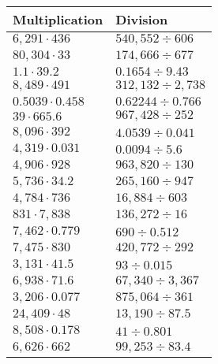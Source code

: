 \begin{longtable}[]{@{}ll@{}}
\toprule
Multiplication & Division\tabularnewline
\midrule
\endhead
\(6,291\cdot436\) & \(540,552÷606\)\tabularnewline
\(80,304\cdot33\) & \(174,666÷677\)\tabularnewline
\(1.1\cdot39.2\) & \(0.1654÷9.43\)\tabularnewline
\(8,489\cdot491\) & \(312,132÷2,738\)\tabularnewline
\(0.5039\cdot0.458\) & \(0.62244÷0.766\)\tabularnewline
\(39\cdot665.6\) & \(967,428÷252\)\tabularnewline
\(8,096\cdot392\) & \(4.0539÷0.041\)\tabularnewline
\(4,319\cdot0.031\) & \(0.0094÷5.6\)\tabularnewline
\(4,906\cdot928\) & \(963,820÷130\)\tabularnewline
\(5,736\cdot34.2\) & \(265,160÷947\)\tabularnewline
\(4,784\cdot736\) & \(16,884÷603\)\tabularnewline
\(831\cdot7,838\) & \(136,272÷16\)\tabularnewline
\(7,462\cdot0.779\) & \(690÷0.512\)\tabularnewline
\(7,475\cdot830\) & \(420,772÷292\)\tabularnewline
\(3,131\cdot41.5\) & \(93÷0.015\)\tabularnewline
\(6,938\cdot71.6\) & \(67,340÷3,367\)\tabularnewline
\(3,206\cdot0.077\) & \(875,064÷361\)\tabularnewline
\(24,409\cdot48\) & \(13,190÷87.5\)\tabularnewline
\(8,508\cdot0.178\) & \(41÷0.801\)\tabularnewline
\(6,626\cdot662\) & \(99,253÷83.4\)\tabularnewline
\bottomrule
\end{longtable}
